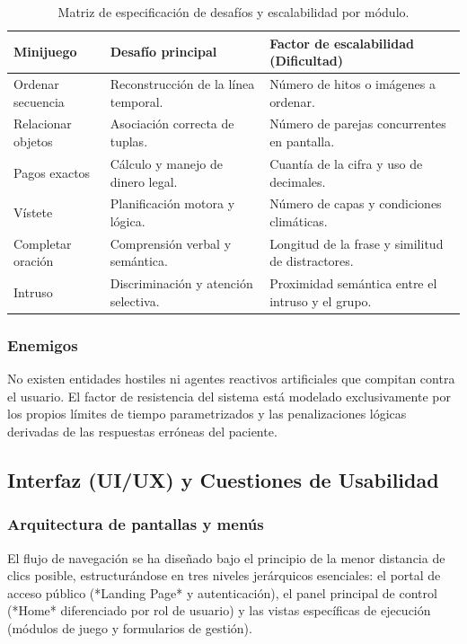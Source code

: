 \begin{table}[htbp]
\centering
\caption{Matriz de especificación de desafíos y escalabilidad por módulo.}
\label{tab:desafios}
\small
\renewcommand{\arraystretch}{1.4}
\begin{tabularx}{\textwidth}{|l|>{\raggedright\arraybackslash}X|>{\raggedright\arraybackslash}X|}
\hline
\textbf{Minijuego} & \textbf{Desafío principal} & \textbf{Factor de escalabilidad (Dificultad)} \\ \hline
Ordenar secuencia & Reconstrucción de la línea temporal. & Número de hitos o imágenes a ordenar. \\ \hline
Relacionar objetos & Asociación correcta de tuplas. & Número de parejas concurrentes en pantalla. \\ \hline
Pagos exactos & Cálculo y manejo de dinero legal. & Cuantía de la cifra y uso de decimales. \\ \hline
Vístete & Planificación motora y lógica. & Número de capas y condiciones climáticas. \\ \hline
Completar oración & Comprensión verbal y semántica. & Longitud de la frase y similitud de distractores. \\ \hline
Intruso & Discriminación y atención selectiva. & Proximidad semántica entre el intruso y el grupo. \\ \hline
\end{tabularx}
\end{table}


\subsubsection{Enemigos}
No existen entidades hostiles ni agentes reactivos artificiales que compitan contra el usuario. El factor de resistencia del sistema está modelado exclusivamente por los propios límites de tiempo parametrizados y las penalizaciones lógicas derivadas de las respuestas erróneas del paciente.

\subsection{Interfaz (UI/UX) y Cuestiones de Usabilidad}

\subsubsection{Arquitectura de pantallas y menús}
El flujo de navegación se ha diseñado bajo el principio de la menor distancia de clics posible, estructurándose en tres niveles jerárquicos esenciales: el portal de acceso público (*Landing Page* y autenticación), el panel principal de control (*Home* diferenciado por rol de usuario) y las vistas específicas de ejecución (módulos de juego y formularios de gestión).

